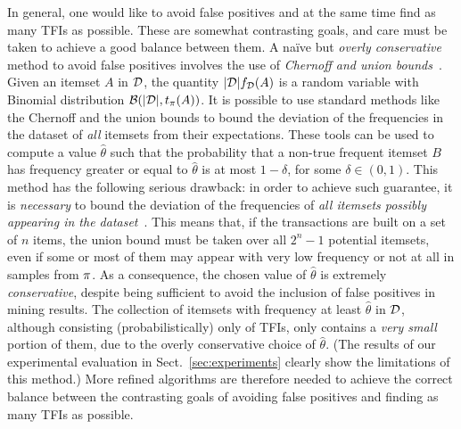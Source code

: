 In general, one would like to avoid false positives and 
at the same time find as many TFIs as possible. These are somewhat contrasting
goals, and care must be taken to achieve a good balance between them.
A na\"ive but \emph{overly conservative} method to avoid false positives
involves the use of \emph{Chernoff and union bounds}~\citep{MitzenmacherU05}.
Given an itemset $A$ in ${\cal D}$, the quantity $|{\cal D}|f_{\cal D}(A)$ is a random variable with
Binomial distribution $\mathcal{B}(|{\cal D}|,t_\pi(A))$. It is possible to use
standard methods like the Chernoff and the union bounds to bound the deviation
of the frequencies in the dataset of \emph{all} itemsets from their
expectations. These tools can be used to compute a value $\hat\theta$ such that
the probability that a non-true frequent itemset $B$ has frequency
greater or equal to $\hat\theta$ is at most $1-\delta$, for some
$\delta\in(0,1)$. This method has the following serious drawback: in order to
achieve such guarantee, it is \emph{necessary} to bound the deviation of the
frequencies of \emph{all itemsets possibly appearing in the dataset}~\citep{KirschMAPUV12}. This means
that, if the transactions are built on a set of $n$ items, the union bound must
be taken over all $2^n-1$ potential itemsets, even if some or most of them may
appear with very low frequency or not at all in samples from $\pi$. As a
consequence, the chosen value of $\hat\theta$ is extremely \emph{conservative}, despite
being sufficient to avoid the inclusion of false positives in mining results.  %
The collection of itemsets with frequency at least $\hat\theta$ in ${\cal D}$,
although consisting (probabilistically) only of TFIs, only contains a
\emph{very small} portion of them, due to the overly conservative choice of
$\hat\theta$. (The results of our experimental evaluation
in Sect.~\ref{sec:experiments} clearly show the limitations of this method.) More
refined algorithms are therefore needed to achieve the correct balance between
the contrasting goals of avoiding false positives and finding as many TFIs as
possible.



